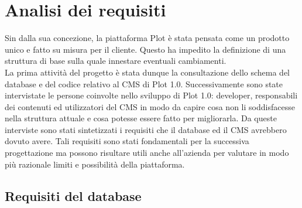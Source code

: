 
\chapter{Analisi dei requisiti}
\label{cap:analisi-requisiti}

Sin dalla sua concezione, la piattaforma Plot è stata pensata come un prodotto unico e fatto su misura per il cliente. Questo ha impedito la definizione di una struttura di base sulla quale innestare eventuali cambiamenti. \\
La prima attività del progetto è stata dunque la consultazione dello schema del database e del codice relativo al CMS di Plot 1.0. Successivamente sono state intervistate le persone coinvolte nello sviluppo di Plot 1.0: developer, responsabili dei contenuti ed utilizzatori del CMS in modo da capire cosa non li soddisfacesse nella struttura attuale e cosa potesse essere fatto per migliorarla.
Da queste interviste sono stati sintetizzati i requisiti che il database ed il CMS avrebbero dovuto avere. Tali requisiti sono stati fondamentali per la successiva progettazione ma possono risultare utili anche all'azienda per valutare in modo più razionale limiti e possibilità della piattaforma.

\section{Requisiti del database}
